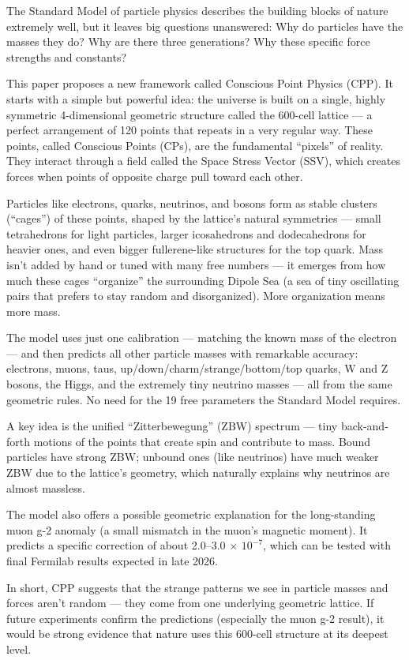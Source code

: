 \documentclass{article}
\begin{document}
The Standard Model of particle physics describes the building blocks of nature extremely well, but it leaves big questions unanswered: Why do particles have the masses they do? Why are there three generations? Why these specific force strengths and constants?

This paper proposes a new framework called Conscious Point Physics (CPP). It starts with a simple but powerful idea: the universe is built on a single, highly symmetric 4-dimensional geometric structure called the 600-cell lattice — a perfect arrangement of 120 points that repeats in a very regular way. These points, called Conscious Points (CPs), are the fundamental “pixels” of reality. They interact through a field called the Space Stress Vector (SSV), which creates forces when points of opposite charge pull toward each other.

Particles like electrons, quarks, neutrinos, and bosons form as stable clusters (“cages”) of these points, shaped by the lattice’s natural symmetries — small tetrahedrons for light particles, larger icosahedrons and dodecahedrons for heavier ones, and even bigger fullerene-like structures for the top quark. Mass isn’t added by hand or tuned with many free numbers — it emerges from how much these cages “organize” the surrounding Dipole Sea (a sea of tiny oscillating pairs that prefers to stay random and disorganized). More organization means more mass.

The model uses just one calibration — matching the known mass of the electron — and then predicts all other particle masses with remarkable accuracy: electrons, muons, taus, up/down/charm/strange/bottom/top quarks, W and Z bosons, the Higgs, and the extremely tiny neutrino masses — all from the same geometric rules. No need for the 19 free parameters the Standard Model requires.

A key idea is the unified “Zitterbewegung” (ZBW) spectrum — tiny back-and-forth motions of the points that create spin and contribute to mass. Bound particles have strong ZBW; unbound ones (like neutrinos) have much weaker ZBW due to the lattice’s geometry, which naturally explains why neutrinos are almost massless.

The model also offers a possible geometric explanation for the long-standing muon g-2 anomaly (a small mismatch in the muon's magnetic moment). It predicts a specific correction of about 2.0–3.0 × $10^{-7}$, which can be tested with final Fermilab results expected in late 2026.

In short, CPP suggests that the strange patterns we see in particle masses and forces aren’t random — they come from one underlying geometric lattice. If future experiments confirm the predictions (especially the muon g-2 result), it would be strong evidence that nature uses this 600-cell structure at its deepest level.
\end{document}
